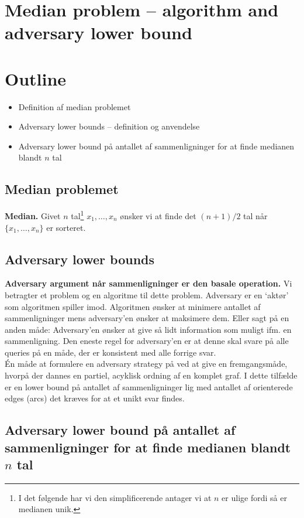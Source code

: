\section{Median problem -- algorithm and adversary lower bound}

\section*{Outline}
\begin{itemize}
	\item Definition af median problemet
	\item Adversary lower bounds -- definition og anvendelse 
	\item Adversary lower bound på antallet af sammenligninger for at finde medianen blandt $n$ tal
\end{itemize}

\subsection*{Median problemet}

\textbf{Median.} Givet $n$ tal\footnote{I det følgende har vi den simplificerende antager vi at $n$ er ulige fordi så er medianen unik.}  $x_1,\ldots,x_n$ ønsker vi at finde det $(n+1)/2$ tal når $\{x_1,\ldots,x_n\}$ er sorteret. 

\subsection*{Adversary lower bounds}

\textbf{Adversary argument når sammenligninger er den basale operation.} Vi betragter et problem og en algoritme til dette problem. Adversary er en `aktør' som algoritmen spiller imod. Algoritmen ønsker at minimere antallet af sammenligninger mens adversary'en ønsker at maksimere dem. Eller sagt på en anden måde: Adversary'en ønsker at give så lidt information som muligt ifm. en sammenligning. Den eneste regel for adversary'en er at denne skal svare på alle queries på en måde, der er konsistent med alle forrige svar. \\

Én måde at formulere en adversary strategy på ved at give en fremgangsmåde, hvorpå der dannes en partiel, acyklisk ordning af en komplet graf. I dette tilfælde er en lower bound på antallet af sammenligninger lig med antallet af orienterede edges (arcs) det kræves for at et unikt svar findes.

\subsection*{Adversary lower bound på antallet af sammenligninger for at finde medianen blandt $n$ tal}

